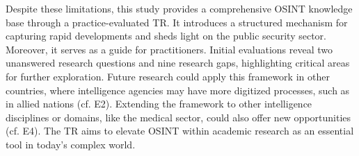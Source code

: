 \documentclass[10pt]{article}
\begin{document}
Despite these limitations, this study provides a comprehensive OSINT knowledge base through a practice-evaluated TR. It introduces a structured mechanism for capturing rapid developments and sheds light on the public security sector. Moreover, it serves as a guide for practitioners. Initial evaluations reveal two unanswered research questions and nine research gaps, highlighting critical areas for further exploration. Future research could apply this framework in other countries, where intelligence agencies may have more digitized processes, such as in allied nations (cf. E2). Extending the framework to other intelligence disciplines or domains, like the medical sector, could also offer new opportunities (cf. E4). The TR aims to elevate OSINT within academic research as an essential tool in today’s complex world.



\end{document}
